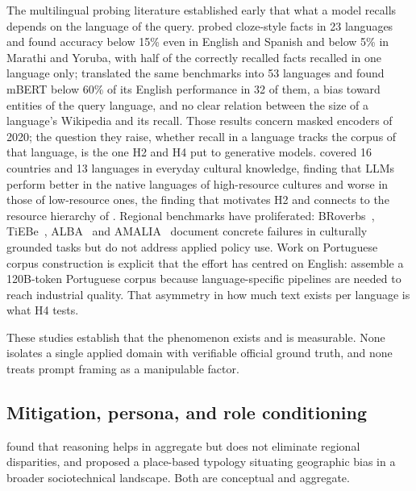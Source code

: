 The multilingual probing literature established early that what a model
recalls depends on the language of the query. \citet{jiang2020xfactr} probed
cloze-style facts in 23 languages and found accuracy below 15\% even in English
and Spanish and below 5\% in Marathi and Yoruba, with half of the correctly
recalled facts recalled in one language only; \citet{kassner2021mlama}
translated the same benchmarks into 53 languages and found mBERT below 60\% of
its English performance in 32 of them, a bias toward entities of the query
language, and no clear relation between the size of a language's Wikipedia and
its recall. Those results concern masked encoders of 2020; the question they
raise, whether recall in a language tracks the corpus of that language, is the
one H2 and H4 put to generative models. \citet{myung2024blend} covered 16
countries and 13 languages in everyday cultural knowledge, finding that LLMs perform better in the
native languages of high-resource cultures and worse in those of low-resource
ones, the finding that motivates H2 and connects to the resource hierarchy of
\citet{joshi2020state}. Regional benchmarks have proliferated:
BRoverbs~\citep{broverbs2025}, TiEBe~\citep{almeida2025tiebe},
ALBA~\citep{alba2026} and AMALIA~\citep{amalia2026} document concrete failures in
culturally grounded tasks but do not address applied policy use. Work on
Portuguese corpus construction is explicit that the effort has centred on
English: \citet{almeida2025portuguese} assemble a 120B-token Portuguese corpus
because language-specific pipelines are needed to reach industrial quality. That
asymmetry in how much text exists per language is what H4 tests.

These studies establish that the phenomenon exists and is measurable. None
isolates a single applied domain with verifiable official ground truth, and none
treats prompt framing as a manipulable factor.

\subsection{Mitigation, persona, and role conditioning}

\citet{opuszko2026unraveling} found that reasoning helps in aggregate but does
not eliminate regional disparities, and \citet{kerche2026silicon} proposed a
place-based typology situating geographic bias in a broader sociotechnical
landscape. Both are conceptual and aggregate.

